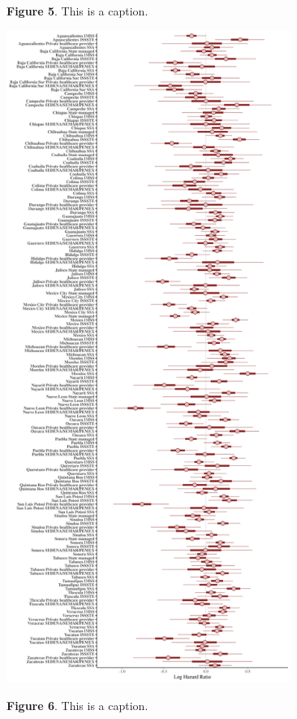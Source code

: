 \documentclass[10pt,letterpaper]{article}
\begin{document}
\textbf{Figure 5}. This is a caption.

\begin{center}\includegraphics[width=350px]{../CC2/jer2modi/mu_12_intervalsjer2modi} \end{center}

\textbf{Figure 6}. This is a caption.
\end{document}
